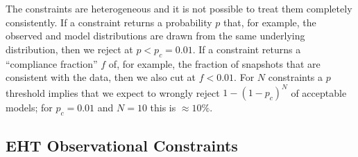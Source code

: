 The constraints are heterogeneous and it is not possible to treat them completely consistently.  If a constraint returns a probability $p$ that, for example, the observed and model distributions are drawn from the same underlying distribution, then we reject at $p < p_c = 0.01$.  If a constraint returns a ``compliance fraction'' $f$ of, for example, the fraction of snapshots that are consistent with the data, then we also cut at $f < 0.01$.  For $N$ constraints a $p$ threshold implies that we expect to wrongly reject $1 - (1 - p_c)^N$ of acceptable models; for $p_c = 0.01$ and $N = 10$ this is $\approx 10\%$.


\subsection{EHT Observational Constraints}



